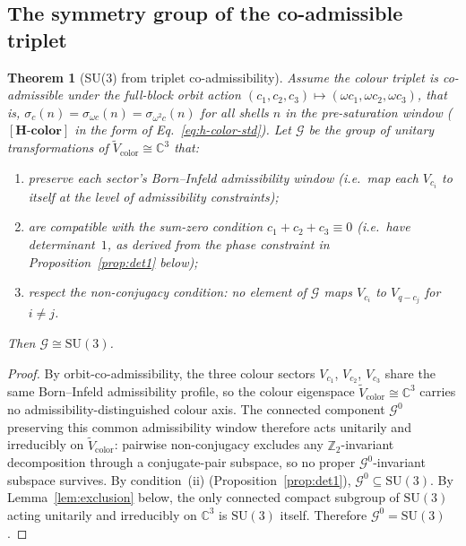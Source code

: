 \documentclass[11pt,a4paper]{article}
\newtheorem{theorem}{Theorem}[section]
\theoremstyle{definition}
\theoremstyle{remark}
\newcommand{\SU}{\mathrm{SU}}
\newcommand{\Hcolor}{\mathbf{[H\text{-}color]}}
\newcommand{\Z}{\mathbb{Z}}
\newcommand{\C}{\mathbb{C}}
\begin{document}
    \subsection{The symmetry group of the co-admissible triplet}
      \label{ssec:sym-group}

      \begin{theorem}[SU(3) from triplet co-admissibility]
        \label{thm:su3-from-triplet}
        Assume the colour triplet is co-admissible under the full-block orbit action
        $(c_1, c_2, c_3) \mapsto (\omega c_1, \omega c_2, \omega c_3)$, that is,
        $\sigma_c(n) = \sigma_{\omega c}(n) = \sigma_{\omega^2 c}(n)$ for all shells $n$ in the
        pre-saturation window ($\Hcolor$ in the form of Eq.~\eqref{eq:h-color-std}).
        Let $\mathcal{G}$ be the group of unitary transformations of $\tilde{V}_{\mathrm{color}} \cong \C^3$
        that:
        \begin{enumerate}[label=(\roman*)]
\item preserve each sector's Born--Infeld admissibility window (i.e.\ map each $V_{c_i}$
to itself at the level of admissibility constraints);
\item are compatible with the sum-zero condition $c_1 + c_2 + c_3 \equiv 0$ (i.e.\ have
determinant~$1$, as derived from the phase constraint in Proposition~\ref{prop:det1} below);
\item respect the non-conjugacy condition: no element of $\mathcal{G}$ maps $V_{c_i}$ to
$V_{q-c_j}$ for $i \neq j$.
        \end{enumerate}
        Then $\mathcal{G} \cong \SU(3)$.
      \end{theorem}

      \begin{proof}
        By orbit-co-admissibility, the three colour sectors $V_{c_1}$, $V_{c_2}$, $V_{c_3}$ share the
        same Born--Infeld admissibility profile, so the colour eigenspace
        $\tilde{V}_{\mathrm{color}} \cong \C^3$ carries no admissibility-distinguished colour axis.
        The connected component $\mathcal{G}^0$ preserving this common admissibility window therefore
        acts unitarily and irreducibly on $\tilde{V}_{\mathrm{color}}$: pairwise non-conjugacy
        excludes any $\Z_2$-invariant decomposition through a conjugate-pair subspace, so no proper
        $\mathcal{G}^0$-invariant subspace survives.
        By condition~(ii) (Proposition~\ref{prop:det1}), $\mathcal{G}^0 \subseteq \mathrm{SU}(3)$.
        By Lemma~\ref{lem:exclusion} below, the only connected compact subgroup of $\SU(3)$ acting
        unitarily and irreducibly on $\C^3$ is $\SU(3)$ itself.
        Therefore $\mathcal{G}^0 = \SU(3)$.
      \end{proof}
\end{document}
